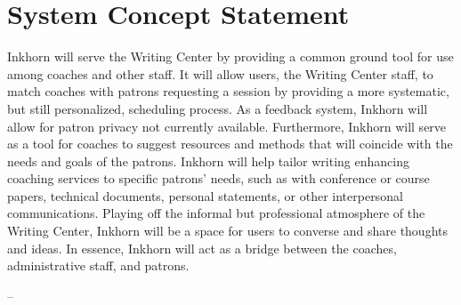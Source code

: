 \documentclass[12pt]{article} %
\begin{document}
\newpage
\section{System Concept Statement} %


  Inkhorn will serve the Writing Center by providing a common ground tool for use among coaches and other staff.
  It will allow users, the Writing Center staff, to match coaches with patrons requesting a session by providing a more systematic, but still personalized, scheduling process.
  As a feedback system, Inkhorn will allow for patron privacy not currently available.
  Furthermore, Inkhorn will serve as a tool for coaches to suggest resources and methods that will coincide with the needs and goals of the patrons.
  Inkhorn will help tailor writing enhancing coaching services to specific patrons’ needs, such as with conference or course papers, technical documents, personal statements, or other interpersonal communications.
  Playing off the informal but professional atmosphere of the Writing Center, Inkhorn will be a space for users to converse and share thoughts and ideas.
  In essence, Inkhorn will act as a bridge between the coaches, administrative staff, and patrons.

  --
\end{document}
